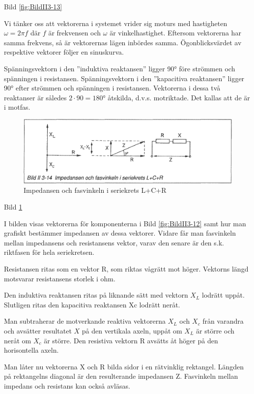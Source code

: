 Bild \ref{fig:BildII3-13}

Vi tänker oss att vektorerna i systemet vrider sig moturs med hastigheten
\(\omega = 2πf\) där \(f\) är frekvensen och \(\omega\) är vinkelhastighet.
Eftersom vektorerna har samma frekvens, så är vektorernas lägen inbördes samma.
Ögonblicksvärdet av respektive vektorer följer en sinuskurva.

Spänningsvektorn i den ''induktiva reaktansen'' ligger 90° före strömmen och
spänningen i resistansen. Spänningsvektorn i den ''kapacitiva reaktansen''
ligger 90° efter strömmen och spänningen i resistansen. Vektorerna i dessa två
reaktanser är således \(2 \cdot 90 = 180°\) åtskilda, d.v.s. motriktade.
Det kallas att de är i motfas.

\begin{figure}
\includegraphics[width=\textwidth]{images/bild_2_3-14}
\caption{Impedansen och fasvinkeln i seriekrets L+C+R}
\label{fig:BildII3-14}
\end{figure}

Bild \ref{fig:BildII3-14}

I bilden visas vektorerna för komponenterna i Bild \ref{fig:BildII3-12} samt
hur man grafiskt bestämmer impedansen av dessa vektorer. Vidare får man
fasvinkeln mellan impedansens och resistansens vektor, varav den senare är den
s.k. riktfasen för hela seriekretsen.

Resistansen ritas som en vektor R, som riktas vågrätt mot höger. Vektorns längd
motsvarar resistansens storlek i ohm.

Den induktiva reaktansen ritas på liknande sätt med vektorn \(X_L\) lodrätt
uppåt. Slutligen ritas den kapacitiva reaktansen Xc lodrätt neråt.

Man subtraherar de motverkande reaktiva vektorerna \(X_L\) och \(X_c\) från
varandra och avsätter resultatet \(X\) på den vertikala axeln, uppåt om \(X_L\)
är större och neråt om \(X_c\) är större. Den resistiva vektorn R avsätts åt
höger på den horisontella axeln.

Man låter nu vektorerna X och R bilda sidor i en rätvinklig rektangel. Längden
på rektangelns diagonal är den resulterande impedansen Z. Fasvinkeln mellan
impedans och resistans kan också avläsas.

